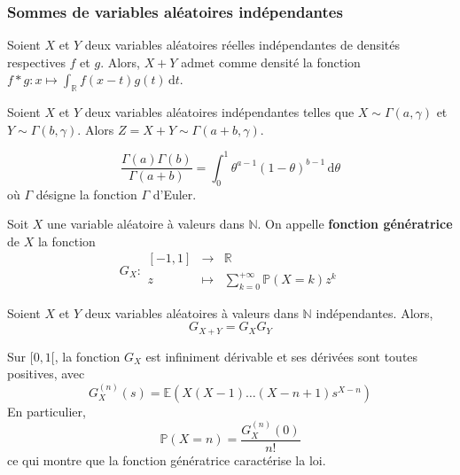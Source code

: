   \subsubsection{Sommes de variables aléatoires indépendantes}


  \begin{theorem}
    Soient $X$ et $Y$ deux variables aléatoires réelles indépendantes de densités respectives $f$ et $g$. Alors, $X + Y$ admet comme densité la fonction $f * g : x \mapsto \int_{\mathbb{R}} f(x-t) g(t) \, \mathrm{d}t$.
  \end{theorem}

  \begin{application}
    Soient $X$ et $Y$ deux variables aléatoires indépendantes telles que $X \sim \Gamma(a, \gamma)$ et $Y \sim \Gamma(b, \gamma)$. Alors $Z = X + Y \sim \Gamma(a+b, \gamma)$.
  \end{application}

  \begin{application}
    \[ \frac{\Gamma(a) \Gamma(b)}{\Gamma(a+b)} = \int_0^1 \theta^{a-1} (1-\theta)^{b-1} \, \mathrm{d}\theta \]
    où $\Gamma$ désigne la fonction $\Gamma$ d'Euler.
  \end{application}


  \begin{definition}
    Soit $X$ une variable aléatoire à valeurs dans $\mathbb{N}$. On appelle \textbf{fonction génératrice} de $X$ la fonction
    \[
    G_X :
    \begin{array}{ccc}
      [-1,1] &\rightarrow& \mathbb{R} \\
      z &\mapsto& \sum_{k=0}^{+\infty} \mathbb{P}(X=k) z^k
    \end{array}
    \]
  \end{definition}

  \begin{proposition}
    Soient $X$ et $Y$ deux variables aléatoires à valeurs dans $\mathbb{N}$ indépendantes. Alors,
    \[ G_{X+Y} = G_X G_Y \]
  \end{proposition}

  \begin{theorem}
    Sur $[0,1[$, la fonction $G_X$ est infiniment dérivable et ses dérivées sont toutes positives, avec
    \[ G_X^{(n)}(s) = \mathbb{E}(X(X-1) \dots (X-n+1)s^{X-n}) \]
    En particulier,
    \[ \mathbb{P}(X=n) = \frac{G_X^{(n)}(0)}{n!} \]
    ce qui montre que la fonction génératrice caractérise la loi.
  \end{theorem}

